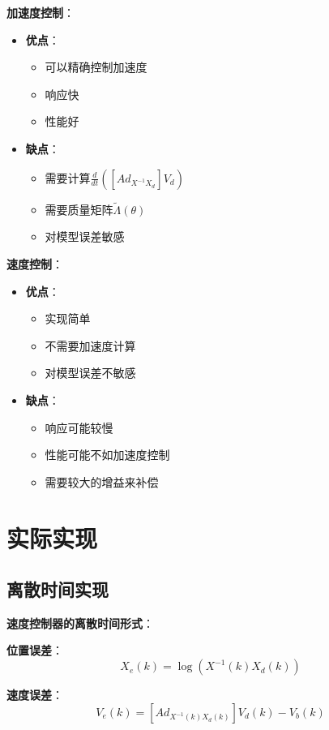 \documentclass[12pt,a4paper]{article}
\begin{document}
\textbf{加速度控制}：
\begin{itemize}
\item \textbf{优点}：
\begin{itemize}
\item 可以精确控制加速度
\item 响应快
\item 性能好
\end{itemize}
\item \textbf{缺点}：
\begin{itemize}
\item 需要计算$\frac{d}{dt}([Ad_{X^{-1}X_d}]V_d)$
\item 需要质量矩阵$\tilde{\Lambda}(\theta)$
\item 对模型误差敏感
\end{itemize}
\end{itemize}

\textbf{速度控制}：
\begin{itemize}
\item \textbf{优点}：
\begin{itemize}
\item 实现简单
\item 不需要加速度计算
\item 对模型误差不敏感
\end{itemize}
\item \textbf{缺点}：
\begin{itemize}
\item 响应可能较慢
\item 性能可能不如加速度控制
\item 需要较大的增益来补偿
\end{itemize}
\end{itemize}

\section{实际实现}

\subsection{离散时间实现}

\textbf{速度控制器的离散时间形式}：

\textbf{位置误差}：
\begin{equation}
X_e(k) = \log(X^{-1}(k)X_d(k))
\end{equation}

\textbf{速度误差}：
\begin{equation}
V_e(k) = [Ad_{X^{-1}(k)X_d(k)}]V_d(k) - V_b(k)
\end{equation}
\end{document}
